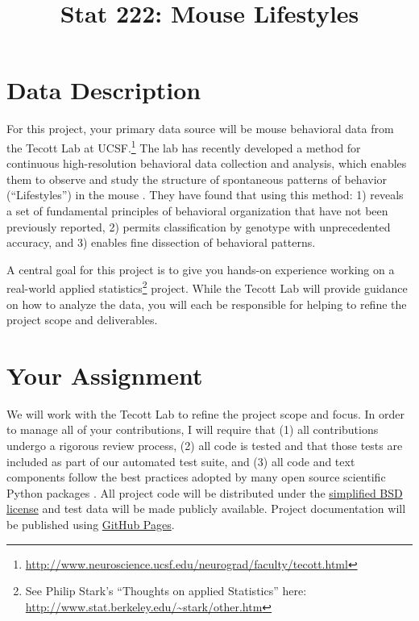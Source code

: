 \documentclass[11pt, oneside]{article}   	%
\title{Stat 222: Mouse Lifestyles}
\begin{document}
\maketitle

\section{Data Description}

For this project, your primary data source will be mouse behavioral data from
the Tecott Lab at
UCSF.\footnote{\url{http://www.neuroscience.ucsf.edu/neurograd/faculty/tecott.html}}
The lab has recently developed a method for continuous high-resolution
behavioral data collection and analysis, which enables them to observe and
study the structure of spontaneous patterns of behavior (``Lifestyles'') in the
mouse \cite{tecott2003genes, tecott2004neurobehavioral, goulding2008robust,
anderson2014toward}.  They have found that using this method: 1) reveals a set
of fundamental principles of behavioral organization that have not been
previously reported, 2) permits classification by genotype with unprecedented
accuracy, and 3) enables fine dissection of behavioral patterns.

A central goal for this project is to give you hands-on experience working on
a real-world applied statistics\footnote{See Philip Stark's ``Thoughts on applied
Statistics'' here: \url{http://www.stat.berkeley.edu/~stark/other.htm}}
project.  While the Tecott Lab will provide guidance on how to analyze the
data, you will each be responsible for helping to refine the project scope and
deliverables.

\section{Your Assignment}

We will work with the Tecott Lab to refine the project scope and focus.  In
order to manage all of your contributions, I will require that (1) all
contributions undergo a rigorous review process, (2) all code is tested and
that those tests are included as part of our automated test suite, and (3) all
code and text components follow the best practices adopted by many open source
scientific Python packages \cite{millman2014developing}.  All project code will
be distributed under the
\href{https://en.wikipedia.org/wiki/BSD_licenses\#2-clause_license_.28.22Simplified_BSD_License.22_or_.22FreeBSD_License.22.29}{simplified
BSD license} and test data will be made publicly available.  Project
documentation will be published using \href{https://pages.github.com/}{GitHub
Pages}.
\end{document}
